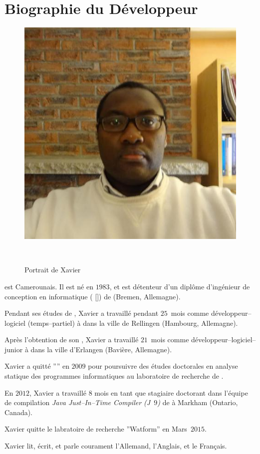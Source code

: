 \vspace{-1.1em}
\section{Biographie du D\'eveloppeur}\label{chap:biography}
\vspace{-0.9em}
\begin{figure}[!htpb]
\centering
\includegraphics[scale=0.35]{../images/XavierNOUNDOU-2}
\caption{Portrait de Xavier}~\label{fig:xaviernoumbis}
\end{figure}

 est Camerounais.
Il est n\'e en $1983$, et est d\'etenteur d'un
dipl\^ome d'ing\'enieur de conception en informatique
(\emph{\diplominformatiker} [\diplinf]) de 
(Bremen, Allemagne).

Pendant ses \'etudes de \diplinf,
Xavier a travaill\'e pendant $25$~mois comme
d\'eveloppeur--logiciel (temps--partiel) \`a
\company{\bergmann} dans la ville de Rellingen
(Hambourg, Allemagne).

Apr\`es l'obtention de son \diplinf, Xavier a travaill\'e
$21$~mois comme d\'eveloppeur--logiciel--junior \`a
\company{\siemens} dans la ville d'Erlangen (Bavi\`ere, Allemagne).

Xavier a quitt\'e ''\siemens'' en $2009$ pour poursuivre
des \'etudes doctorales en analyse statique des programmes
informatiques au laboratoire de recherche 
de .

En $2012$, Xavier a travaill\'e $8$ mois en tant
que stagiaire doctorant dans l'\'equipe de compilation 
\emph{Java Just--In--Time Compiler (J~$9$)} de
 \`a Markham (Ontario, Canada).

Xavier quitte le labratoire de recherche ''Watform''
en Mars~$2015$.

Xavier lit, \'ecrit, et parle courament l'Allemand,
l'Anglais, et le Fran\c{c}ais.
